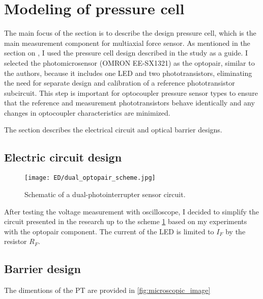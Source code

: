 \section{Modeling of pressure cell}
\label{section:presure_cell_electic_circuit}

The main focus of the section is to describe the design pressure cell, which is the main measurement component for multiaxial force sensor.
As mentioned in the section on , I used the pressure cell design described in the study \cite{my_love_pressure_photosensor} as a guide. 
I selected the photomicrosensor (OMRON EE-SX1321) as the optopair, similar to the authors, because it includes one LED and two phototransistors, 
eliminating the need for separate design and calibration of a reference phototransistor subcircuit. 
This step is important for optocoupler pressure sensor types to ensure that the reference and measurement phototransistors behave identically and any changes in optocoupler characteristics are minimized.

The section describes the electrical circuit and optical barrier designs.

\subsection{Electric circuit design}
\begin{figure}[H]
    \centering
    \texttt{[image: ED/dual\_optopair\_scheme.jpg]}
    \label{fig:dual_optopair_scheme}
    \caption{Schematic of a dual-photointerrupter sensor circuit.}
  \end{figure}

After testing the voltage measurement with oscilloscope, 
I decided to simplify the circuit presented in the research \cite{my_love_pressure_photosensor} up to the scheme \ref{fig:dual_optopair_scheme} based on my experiments with the optopair component.
The current of the LED is limited to $I_F$ by the resistor $R_F$. %

\subsection{Barrier design}
The dimentions of the PT are provided in \ref{fig:microscopic_image}